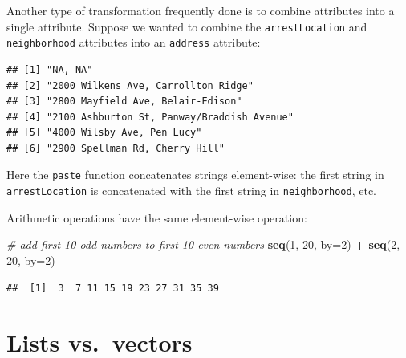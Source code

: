 \documentclass[]{book}
\newenvironment{Shaded}{\begin{snugshade}}{\end{snugshade}}
\newcommand{\KeywordTok}[1]{\textcolor[rgb]{0.13,0.29,0.53}{\textbf{#1}}}
\newcommand{\DataTypeTok}[1]{\textcolor[rgb]{0.13,0.29,0.53}{#1}}
\newcommand{\DecValTok}[1]{\textcolor[rgb]{0.00,0.00,0.81}{#1}}
\newcommand{\StringTok}[1]{\textcolor[rgb]{0.31,0.60,0.02}{#1}}
\newcommand{\CommentTok}[1]{\textcolor[rgb]{0.56,0.35,0.01}{\textit{#1}}}
\newcommand{\OperatorTok}[1]{\textcolor[rgb]{0.81,0.36,0.00}{\textbf{#1}}}
\newcommand{\NormalTok}[1]{#1}
\theoremstyle{definition}
\theoremstyle{definition}
\theoremstyle{remark}
\begin{document}
Another type of transformation frequently done is to combine attributes
into a single attribute. Suppose we wanted to combine the
\texttt{arrestLocation} and \texttt{neighborhood} attributes into an
\texttt{address} attribute:

\begin{Shaded}
\end{Shaded}

\begin{verbatim}
## [1] "NA, NA"                                   
## [2] "2000 Wilkens Ave, Carrollton Ridge"       
## [3] "2800 Mayfield Ave, Belair-Edison"         
## [4] "2100 Ashburton St, Panway/Braddish Avenue"
## [5] "4000 Wilsby Ave, Pen Lucy"                
## [6] "2900 Spellman Rd, Cherry Hill"
\end{verbatim}

Here the \texttt{paste} function concatenates strings element-wise: the
first string in \texttt{arrestLocation} is concatenated with the first
string in \texttt{neighborhood}, etc.

Arithmetic operations have the same element-wise operation:

\begin{Shaded}
\begin{Highlighting}[]
\CommentTok{# add first 10 odd numbers to first 10 even numbers}
\KeywordTok{seq}\NormalTok{(}\DecValTok{1}\NormalTok{, }\DecValTok{20}\NormalTok{, }\DataTypeTok{by=}\DecValTok{2}\NormalTok{) }\OperatorTok{+}\StringTok{ }\KeywordTok{seq}\NormalTok{(}\DecValTok{2}\NormalTok{, }\DecValTok{20}\NormalTok{, }\DataTypeTok{by=}\DecValTok{2}\NormalTok{)}
\end{Highlighting}
\end{Shaded}

\begin{verbatim}
##  [1]  3  7 11 15 19 23 27 31 35 39
\end{verbatim}

\section{Lists vs.~vectors}\label{lists-vs.vectors}
\end{document}

